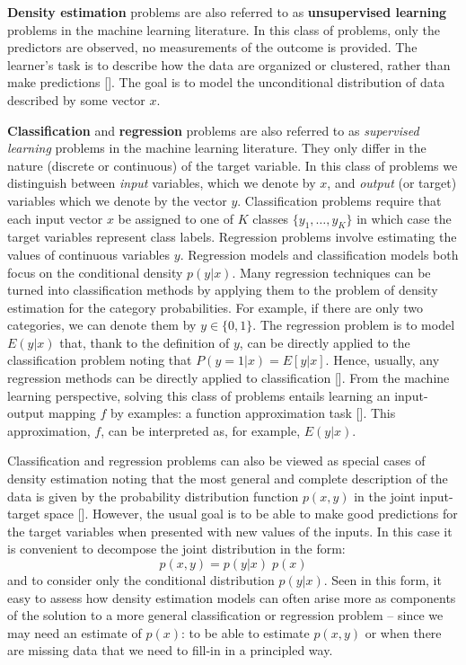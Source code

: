 \textbf{Density estimation} problems are also referred to as \textbf{unsupervised learning} problems in the machine learning literature. In this class of problems, only the predictors are observed, no measurements of the outcome is provided. The learner's task is to describe how the data are organized or clustered, rather than make predictions [\cite{ESL}]. The goal is to model the unconditional distribution of data described by some vector $x$. 

\textbf{Classification} and \textbf{regression} problems are also referred to as \textit{supervised learning} problems in the machine learning literature. They only differ in the nature (discrete or continuous) of the target variable. In this class of problems we distinguish between \textit{input} variables, which we denote by $x$, and \textit{output} (or target) variables which we denote by the vector $y$. Classification problems require that each input vector $x$ be assigned to one of $K$ classes $\{y_1, \dots, y_K\}$ in which case the target variables represent class labels. Regression problems involve estimating the values of continuous variables $y$. Regression models and classification models both focus on the conditional density $p(y|x)$. Many regression techniques can be turned into classification methods by applying them to the problem of density estimation for the category probabilities. For example, if there are only two categories, we can denote them by $y \in \{0,1\}$. The regression problem is to model $E(y|x)$ that, thank to the definition of $y$, can be directly applied to the classification problem noting that $P(y = 1| x) = E[y|x]$. Hence, usually, any regression methods can be directly applied to classification [\cite{Lee2004}]. From the machine learning perspective, solving this class of problems entails learning an input-output mapping $f$ by examples: a function approximation task [\cite{ESL}]. This approximation, $f$, can be interpreted as, for example, $E(y|x)$.

Classification and regression problems can also be viewed as special cases of density estimation noting that the most general and complete description of the data is given by the probability distribution function $p(x,y)$ in the joint input-target space [\cite{Jordan1996}]. However, the usual goal is to be able to make good predictions for the target variables when presented with new values of the inputs. In this case it is convenient to decompose the joint distribution in the form:
$$p(x,y) = p(y|x) \; p(x)$$
and to consider only the conditional distribution $p(y|x)$. Seen in this form, it easy to assess how density estimation models can often arise more as components of the solution to a more general classification or regression problem -- since we may need an estimate of $p(x)$: to be able to estimate $p(x,y)$ or when there are missing data that we need to fill-in in a principled way. 

